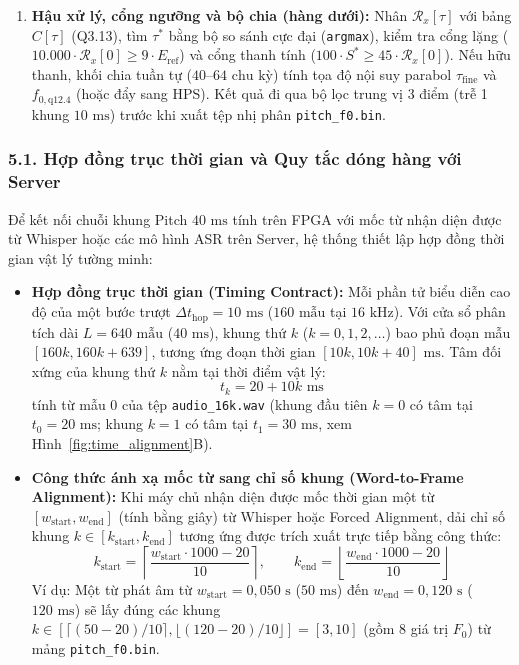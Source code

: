 \documentclass[11pt,a4paper]{article}
\begin{document}
\begin{enumerate}
    \item \textbf{Hậu xử lý, cổng ngưỡng và bộ chia (hàng dưới):} Nhân $\mathcal{R}_x[\tau]$ với bảng $C[\tau]$ (Q3.13), tìm $\tau^*$ bằng bộ so sánh cực đại (\texttt{argmax}), kiểm tra cổng lặng ($10.000 \cdot \mathcal{R}_x[0] \ge 9 \cdot E_{\text{ref}}$) và cổng thanh tính ($100 \cdot S^* \ge 45 \cdot \mathcal{R}_x[0]$). Nếu hữu thanh, khối chia tuần tự ($40\text{--}64\text{ chu kỳ}$) tính tọa độ nội suy parabol $\tau_{\text{fine}}$ và $f_{0,\text{q12.4}}$ (hoặc đẩy sang HPS). Kết quả đi qua bộ lọc trung vị 3 điểm (trễ 1 khung $10\text{ ms}$) trước khi xuất tệp nhị phân \texttt{pitch\_f0.bin}.
\end{enumerate}



\subsubsection*{5.1. Hợp đồng trục thời gian và Quy tắc dóng hàng với Server}

Để kết nối chuỗi khung Pitch $40\text{ ms}$ tính trên FPGA với mốc từ nhận diện được từ Whisper hoặc các mô hình ASR trên Server, hệ thống thiết lập hợp đồng thời gian vật lý tường minh:
\begin{itemize}
    \setlength{\itemsep}{1pt}
    \item \textbf{Hợp đồng trục thời gian (Timing Contract):} Mỗi phần tử biểu diễn cao độ của một bước trượt $\Delta t_{\text{hop}} = 10\text{ ms}$ ($160\text{ mẫu}$ tại $16\text{ kHz}$). Với cửa sổ phân tích dài $L = 640\text{ mẫu}$ ($40\text{ ms}$), khung thứ $k$ ($k = 0, 1, 2, \dots$) bao phủ đoạn mẫu $[160k, 160k + 639]$, tương ứng đoạn thời gian $[10k, 10k + 40]\text{ ms}$. Tâm đối xứng của khung thứ $k$ nằm tại thời điểm vật lý:
    \begin{equation}
    t_k = 20 + 10k\text{ ms}
    \label{eq:frame_center_timestamp}
    \end{equation}
    tính từ mẫu 0 của tệp \texttt{audio\_16k.wav} (khung đầu tiên $k = 0$ có tâm tại $t_0 = 20\text{ ms}$; khung $k = 1$ có tâm tại $t_1 = 30\text{ ms}$, xem Hình~\ref{fig:time_alignment}B).
    \item \textbf{Công thức ánh xạ mốc từ sang chỉ số khung (Word-to-Frame Alignment):} Khi máy chủ nhận diện được mốc thời gian một từ $[w_{\text{start}}, w_{\text{end}}]$ (tính bằng giây) từ Whisper hoặc Forced Alignment, dải chỉ số khung $k \in [k_{\text{start}}, k_{\text{end}}]$ tương ứng được trích xuất trực tiếp bằng công thức:
    \begin{equation}
    k_{\text{start}} = \left\lceil \frac{w_{\text{start}} \cdot 1000 - 20}{10} \right\rceil, \qquad k_{\text{end}} = \left\lfloor \frac{w_{\text{end}} \cdot 1000 - 20}{10} \right\rfloor
    \label{eq:word_to_frame_formula}
    \end{equation}
    Ví dụ: Một từ phát âm từ $w_{\text{start}} = 0{,}050\text{ s}$ ($50\text{ ms}$) đến $w_{\text{end}} = 0{,}120\text{ s}$ ($120\text{ ms}$) sẽ lấy đúng các khung $k \in [\lceil (50-20)/10 \rceil, \lfloor (120-20)/10 \rfloor] = [3, 10]$ (gồm 8 giá trị $F_0$) từ mảng \texttt{pitch\_f0.bin}.
\end{itemize}
\end{document}
